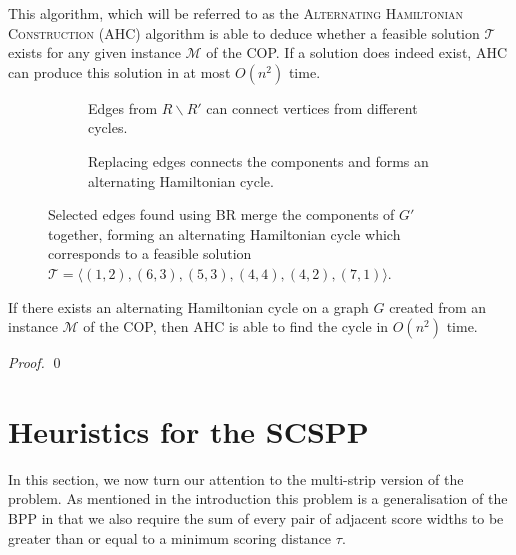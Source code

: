 \documentclass[oribibl]{llncs}
\begin{document}
This algorithm, which will be referred to as the \textsc{Alternating Hamiltonian Construction} (AHC) algorithm is able to deduce whether a feasible solution $\mathcal{T}$ exists for any given instance $\mathcal{M}$ of the COP. If a solution does indeed exist, AHC can produce this solution in at most $O(n^2)$ time.

\begin{figure}	
	\centering
	\begin{subfigure}[H]{0.5\textwidth}
		
		\caption{Edges from $R\backslash R'$ can connect vertices from different cycles.}	
		\label{fig:mpsconnect}
	\end{subfigure}
	\begin{subfigure}[H]{0.5\textwidth}
		
		\caption{Replacing edges connects the components and forms an alternating Hamiltonian cycle.}	
		\label{fig:mpscycle}
	\end{subfigure}
	\caption{Selected edges found using BR merge the components of $G'$ together, forming an alternating Hamiltonian cycle which corresponds to a feasible solution $\mathcal{T} = \langle(1,2), (6,3), (5,3), (4,4), (4,2), (7,1) \rangle$.}
	\label{fig:connect/cycle}
\end{figure}


\begin{theorem}
	\label{thm:copsoln}
	If there exists an alternating Hamiltonian cycle on a graph $G$ created from an instance $\mathcal{M}$ of the COP, then AHC is able to find the cycle in $O(n^2)$ time.
\end{theorem}
\begin{proof}
	\qed
\end{proof}


\section{Heuristics for the SCSPP}
\label{sec:scsppsoln}

In this section, we now turn our attention to the multi-strip version of the problem. As mentioned in the introduction this problem is a generalisation of the BPP in that we also require the sum of every pair of adjacent score widths to be greater than or equal to a minimum scoring distance $\tau$.
\end{document}
